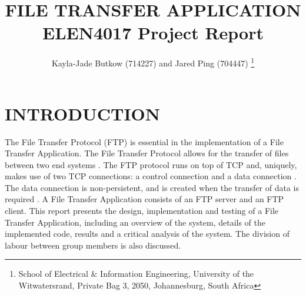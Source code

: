 \documentclass[10pt,twocolumn]{witseiepaper}
\begin{document}
\title{FILE TRANSFER APPLICATION  \\ ELEN4017 Project Report}

\author{Kayla-Jade Butkow (714227) and Jared Ping (704447)
\thanks{School of Electrical \& Information Engineering, University of the
Witwatersrand, Private Bag 3, 2050, Johannesburg, South Africa}
}


%


\maketitle
\thispagestyle{empty}
\pagestyle{plain}
\setcounter{page}{1}

%
\section{INTRODUCTION}
The File Transfer Protocol (FTP) is essential in the implementation of a File Transfer Application. The File Transfer Protocol allows for the transfer of files between two end systems \cite{kurose}. The FTP protocol runs on top of TCP and, uniquely, makes use of two TCP connections: a control connection and a data connection \cite{kurose}. The data connection is non-persistent, and is created when the transfer of data is required \cite{kurose}. A File Transfer Application consists of an FTP server and an FTP client. This report presents the design, implementation and testing of a File Transfer Application, including an overview of the system, details of the implemented code, results and a critical analysis of the system. The division of labour between group members is also discussed.
\end{document}
